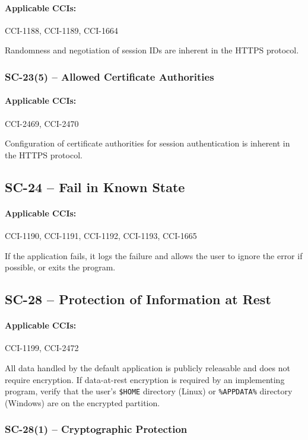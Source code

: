 \documentclass[letterpaper, 10pt, twoside]{article}
\begin{document}
\paragraph{Applicable CCIs:} CCI-1188, CCI-1189, CCI-1664

Randomness and negotiation of session IDs are inherent in the HTTPS protocol.

\subsubsection{SC-23(5) -- Allowed Certificate Authorities}

\paragraph{Applicable CCIs:} CCI-2469, CCI-2470 

Configuration of certificate authorities for session authentication is inherent in the HTTPS protocol.

\subsection{SC-24 -- Fail in Known State}

\paragraph{Applicable CCIs:} CCI-1190, CCI-1191, CCI-1192, CCI-1193, CCI-1665

If the application fails, it logs the failure and allows the user to ignore the error if possible, or exits the program.

\subsection{SC-28 -- Protection of Information at Rest}
\label{sec:sc-28}

\paragraph{Applicable CCIs:} CCI-1199, CCI-2472

All data handled by the default application is publicly releasable and does not require encryption. If data-at-rest encryption is required by an implementing program, verify that the user's \texttt{\$HOME} directory (Linux) or \texttt{\%APPDATA\%} directory (Windows) are on the encrypted partition.

\subsubsection{SC-28(1) -- Cryptographic Protection}
\end{document}
